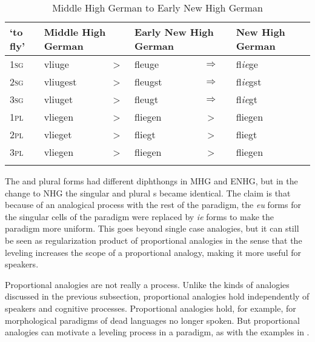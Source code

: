 
\begin{table}
    \small
    \caption{Middle High German to Early New High German}\label{tab:exe-change-nhg}
    \begin{tabular}[t]{llclcl}
      \lsptoprule
      `to fly' & \multicolumn{2}{l}{Middle High German} & \multicolumn{2}{l}{Early New High German} & New High German                            \\
      \midrule
      \textsc{1sg}      & vliuge                                 & >                                         & fleuge  & $\Rightarrow$ & fl\textit{ie}ge  \\
      \textsc{2sg}      & vliugest                               & >                                         & fleugst & $\Rightarrow$ & fl\textit{ie}gst \\
      \textsc{3sg}      & vliuget                                & >                                         & fleugt  & $\Rightarrow$ & fl\textit{ie}gt  \\
      \textsc{1pl}      & vliegen                                & >                                         & fliegen & >             & fliegen          \\
      \textsc{2pl}      & vlieget                                & >                                         & fliegt  & >             & fliegt           \\
      \textsc{3pl}      & vliegen                                & >                                         & fliegen & >             & fliegen          \\
      \lspbottomrule
    \end{tabular}
\end{table}

The  and plural forms had different diphthongs in MHG and ENHG, but in the change to NHG the singular and plural s became identical. The claim is that because of an analogical process with the rest of the paradigm, the \textit{eu} forms for the singular cells of the paradigm were replaced by \textit{ie} forms to make the paradigm more uniform. This goes beyond single case analogies, but it can still be seen as regularization product of proportional analogies in the sense that the leveling increases the scope of a proportional analogy, making it more useful for speakers.

Proportional analogies are not really a process. Unlike the kinds of analogies discussed in the previous subsection, proportional analogies hold independently of speakers and cognitive processes. Proportional analogies hold, for example, for morphological paradigms of dead languages no longer spoken. But proportional analogies can motivate a leveling process in a paradigm, as with the examples in .

